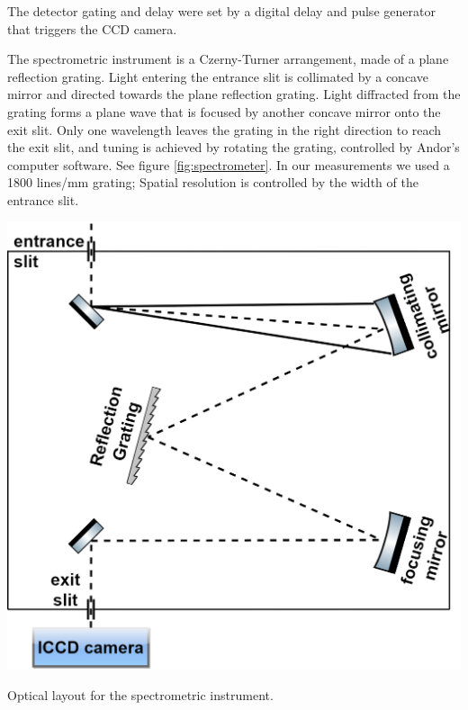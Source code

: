 \documentclass[../main.tex]{subfiles}
\begin{document}
The detector gating and delay were set by a digital delay and pulse generator that triggers the CCD camera.

The spectrometric instrument is a Czerny-Turner arrangement, made of a plane reflection grating. Light entering the entrance slit is collimated by a concave mirror and directed towards the plane reflection grating. Light diffracted from the grating forms a plane wave that is focused by another concave mirror onto the exit slit. Only one wavelength leaves the grating in the right direction to reach the exit slit, and tuning is achieved by rotating the grating, controlled by Andor's computer software. See figure \ref{fig:spectrometer}. In our measurements we used a 1800 lines/mm grating; Spatial resolution is controlled by the width of the entrance slit.
\begin{marginfigure}
\includegraphics[width=\marginparwidth]{figures/spectro/spectrometer.png}
\caption{Optical layout for the spectrometric instrument.}
\label{fig:spectrometer}
\end{marginfigure}
\end{document}
